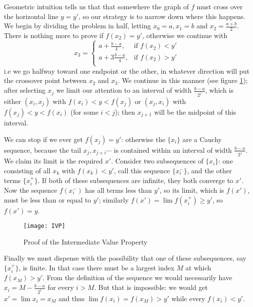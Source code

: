 Geometric intuition tells us that that somewhere the graph of $f$ must cross over the horizontal line $y=y'$, so our strategy is to narrow down where this happens.  We begin by dividing the problem in half, letting $x_0=a, x_1=b$ and $x_2 = \frac{a+b}{2}$. There is nothing more to prove if $f(x_2)=y'$, otherwise we continue with
\[
x_3 = 
\begin{cases}
a+\frac{b-a}{4}, &\text{if $f(x_2)<y'$}\\
a+3\frac{b-a}{4}, &\text{if $f(x_2)>y'$}\\
\end{cases}
\]
i.e we go halfway toward one endpoint or the other, in whatever direction will put the crossover point between $x_2$ and $x_3$. We continue in this manner (see figure \ref{fig:IVP}); after selecting $x_j$ we limit our attention to an interval of width $\frac{b-a}{2^j}$, which is either $(x_i,x_j)$ with $f(x_i) < y < f(x_j)$ or $(x_j,x_i)$ with $f(x_j) < y < f(x_i)$ (for some $i<j$); then $x_{j+1}$ will be the midpoint of this interval.

We can stop if we ever get $f(x_j)=y'$: otherwise the $\{x_i\}$ are a Cauchy sequence, because the tail $x_j, x_{j+i} \cdots$ is contained within an interval of width $\frac{b-a}{2^j}$. We claim its limit is the required $x'$. Consider two subsequences of $\{x_i\}$: one consisting of all $x_k$ with $f(x_k) < y'$, call this sequence $\{x^{-}_i\}$, and the other terms  $\{x^{+}_i\}$. If both of these subsequences are infinite, they both converge to $x'$. Now the sequence $f(x^{-}_i)$ has all terms less than $y'$, so its limit, which is $f(x')$, must be less than or equal to $y'$; similarly $f(x')=\lim f(x^{+}_i) \geq y'$, so $f(x')=y$.

\begin{figure}
\begin{center}
\texttt{[image: IVP]}
\end{center}
\caption{Proof of the Intermediate Value Property \label{fig:IVP}}
\end{figure}


Finally we must dispense with the possibility that one of these subsequences, say $\{x^{+}_i\}$, is finite. In that case there must be a largest index $M$ at which $f(x_M)>y'$. From the definition of the sequence we would necessarily have $x_i = M - \frac{b-a}{2^i}$ for every $i>M$. But that is impossible: we would get $x' = \lim x_i = x_M$ and thus $\lim f(x_i) = f(x_M) > y'$ while every $f(x_i) < y'$.


